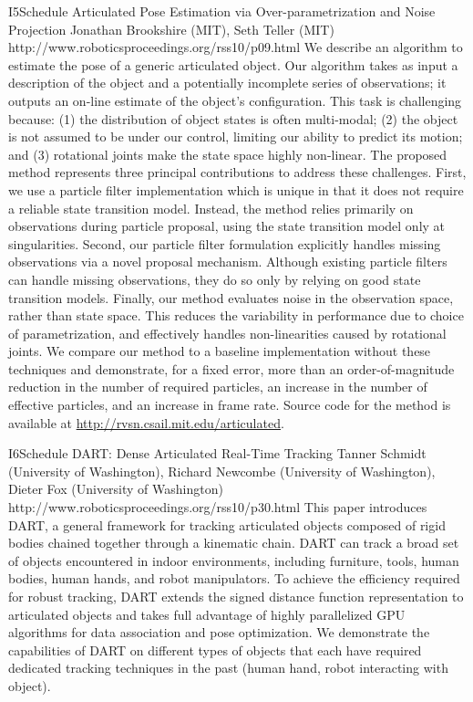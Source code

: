 \begin{spacing}{1.0}
\descriptionPaper
{I5}{Schedule}
{	
Articulated Pose Estimation via Over-parametrization and Noise Projection
}
{
Jonathan Brookshire (MIT), Seth Teller (MIT)
}
{
http://www.roboticsproceedings.org/rss10/p09.html
}
{
We describe an algorithm to estimate the pose of a generic articulated object. Our algorithm takes as input a description of the object and a potentially incomplete series of observations; it outputs an on-line estimate of the object's configuration. This task is challenging because: (1) the distribution of object states is often multi-modal; (2) the object is not assumed to be under our control, limiting our ability to predict its motion; and (3) rotational joints make the state space highly non-linear. The proposed method represents three principal contributions to address these challenges. First, we use a particle filter implementation which is unique in that it does not require a reliable state transition model. Instead, the method relies primarily on observations during particle proposal, using the state transition model only at singularities. Second, our particle filter formulation explicitly handles missing observations via a novel proposal mechanism. Although existing particle filters can handle missing observations, they do so only by relying on good state transition models. Finally, our method evaluates noise in the observation space, rather than state space. This reduces the variability in performance due to choice of parametrization, and effectively handles non-linearities caused by rotational joints. We compare our method to a baseline implementation without these techniques and demonstrate, for a fixed error, more than an order-of-magnitude reduction in the number of required particles, an increase in the number of effective particles, and an increase in frame rate. Source code for the method is available at \url{http://rvsn.csail.mit.edu/articulated}.
}


\descriptionPaper
{I6}{Schedule}
{	
DART: Dense Articulated Real-Time Tracking
}
{
Tanner Schmidt (University of Washington), Richard Newcombe (University of Washington), Dieter Fox (University of Washington)
}
{
http://www.roboticsproceedings.org/rss10/p30.html
}
{
This paper introduces DART, a general framework for tracking articulated objects composed of rigid bodies chained together through a kinematic chain. DART can track a broad set of objects encountered in indoor environments, including furniture, tools, human bodies, human hands, and robot manipulators. To achieve the efficiency required for robust tracking, DART extends the signed distance function representation to articulated objects and takes full advantage of highly parallelized GPU algorithms for data association and pose optimization. We demonstrate the capabilities of DART on different types of objects that each have required dedicated tracking techniques in the past (human hand, robot interacting with object).
}


\vspace*{-2.0cm}

\clearpage


\end{spacing}
